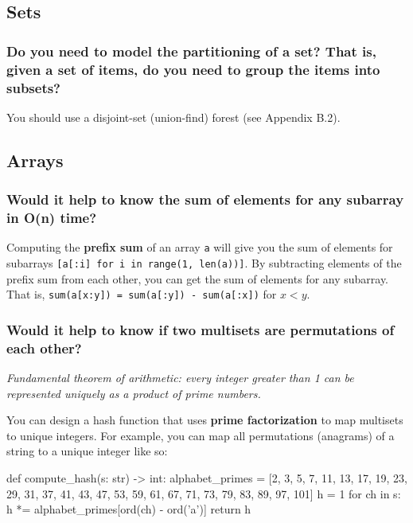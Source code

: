 \documentclass[12pt, titlepage]{article}
\begin{document}
\subsection{Sets}

\subsubsection{Do you need to model the partitioning of a set? That is, given a set of items, do you need to group the items into subsets?}

You should use a disjoint-set (union-find) forest (see Appendix B.2).

\subsection{Arrays}

\subsubsection{Would it help to know the sum of elements for any subarray in O(n) time?}

Computing the \textbf{prefix sum} of an array \texttt{a} will give you the sum of elements for subarrays \texttt{[a[:i] for i in range(1, len(a))]}. By subtracting elements of the prefix sum from each other, you can get the sum of elements for any subarray. That is, \texttt{sum(a[x:y]) = sum(a[:y]) - sum(a[:x])} for $x < y$. \\

\subsubsection{Would it help to know if two multisets are permutations of each other?}

\textit{Fundamental theorem of arithmetic: every integer greater than 1 can be represented uniquely as a product of prime numbers.} \medskip

You can design a hash function that uses \textbf{prime factorization} to map multisets to unique integers. For example, you can map all permutations (anagrams) of a string to a unique integer like so: \medskip

\begin{python}
def compute_hash(s: str) -> int:
    alphabet_primes = [2, 3, 5, 7, 11, 13, 17, 19, 23, 29,
                       31, 37, 41, 43, 47, 53, 59, 61, 67,
                       71, 73, 79, 83, 89, 97, 101]
    h = 1
    for ch in s:
        h *= alphabet_primes[ord(ch) - ord('a')]
    return h
\end{python} \bigskip
\end{document}

